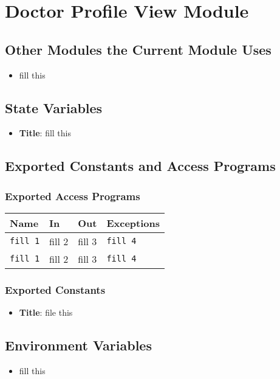 \documentclass[12pt, titlepage]{article}
\begin{document}
\section{Doctor Profile View Module}

\subsection{Other Modules the Current Module Uses}
\begin{itemize}
    \item fill this 
\end{itemize}

\subsection{State Variables}
\begin{itemize}
    \item \textbf{Title}: fill this 
\end{itemize}

\subsection{Exported Constants and Access Programs}
\subsubsection{Exported Access Programs}
\begin{tabular}{|l|l|l|l|}
    \hline
    \textbf{Name} & \textbf{In} & \textbf{Out} & \textbf{Exceptions} \\
    \hline 
    \texttt{fill 1} & fill 2 & fill 3 & \texttt{fill 4} \\
    \hline
    \texttt{fill 1} & fill 2 & fill 3 & \texttt{fill 4} \\
    \hline
\end{tabular}

\subsubsection{Exported Constants}
\begin{itemize}
\item \textbf{Title}: file this 
\end{itemize}

\subsection{Environment Variables}
\begin{itemize}
    \item fill this
\end{itemize}
\end{document}
